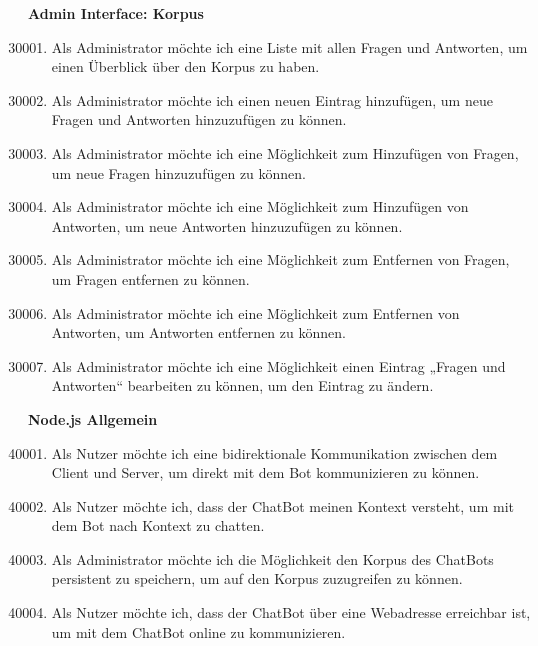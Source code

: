 \textbf{Admin Interface: Korpus}
\begin{enumerate}[leftmargin=*,labelindent=40pt,label=u\arabic*.]
    \setcounter{enumi}{30000}
    \item Als Administrator möchte ich eine Liste mit allen Fragen und Antworten, um einen Überblick über den Korpus zu haben.
    \item Als Administrator möchte ich einen neuen Eintrag hinzufügen, um neue Fragen und Antworten hinzuzufügen zu können.
    \item Als Administrator möchte ich eine Möglichkeit zum Hinzufügen von Fragen, um neue Fragen hinzuzufügen zu können.
    \item Als Administrator möchte ich eine Möglichkeit zum Hinzufügen von Antworten, um neue Antworten hinzuzufügen zu können.
    \item Als Administrator möchte ich eine Möglichkeit zum Entfernen von Fragen, um Fragen entfernen zu können.
    \item Als Administrator möchte ich eine Möglichkeit zum Entfernen von Antworten, um Antworten entfernen zu können.
    \item Als Administrator möchte ich eine Möglichkeit einen Eintrag „Fragen und Antworten“ bearbeiten zu können, um den Eintrag zu ändern.
\end{enumerate}
\newpage
\textbf{Node.js Allgemein}
\begin{enumerate}[leftmargin=*,labelindent=40pt,label=u\arabic*.]
    \setcounter{enumi}{40000}
    \item Als Nutzer möchte ich eine bidirektionale Kommunikation zwischen dem Client und Server, um direkt mit dem Bot kommunizieren zu können.
    \item Als Nutzer möchte ich, dass der ChatBot meinen Kontext versteht, um mit dem Bot nach Kontext zu chatten.
    \item Als Administrator möchte ich die Möglichkeit den Korpus des ChatBots persistent zu speichern, um auf den Korpus zuzugreifen zu können.
    \item Als Nutzer möchte ich, dass der ChatBot über eine Webadresse erreichbar ist, um mit dem ChatBot online zu kommunizieren.
\end{enumerate}

